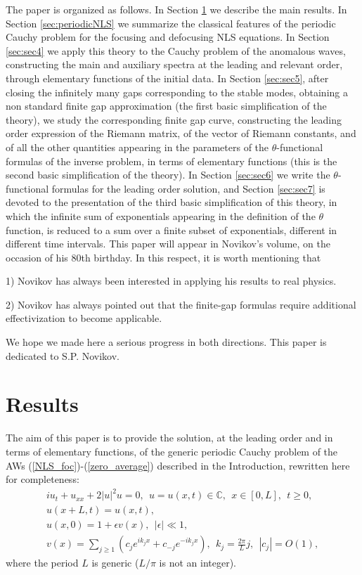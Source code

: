 \documentclass[12pt]{article}
\newcommand{\CC}{\mathbb C}
\newcommand{\beq}{\begin{equation}}
\newcommand{\eeq}{\end{equation}}
\newcommand{\ba}{\begin{array}}
\newcommand{\ea}{\end{array}}
\begin{document}
The paper is organized as follows. In Section \ref{sec:sec2} we describe the main results. In Section \ref{sec:periodicNLS}  we summarize the classical features of the periodic Cauchy problem for the focusing and defocusing NLS equations. In Section \ref{sec:sec4}  we apply this theory to the Cauchy problem of the anomalous waves, constructing the main and auxiliary spectra at the leading and relevant order, through elementary functions of the initial data. In Section \ref{sec:sec5}, after closing the infinitely many gaps corresponding to the stable modes, obtaining a non standard finite gap approximation (the first basic simplification of the theory), we study the corresponding finite gap curve, constructing the leading order expression of the Riemann matrix, of the vector of Riemann constants, and of all the other quantities appearing in the parameters of the $\theta$-functional formulas of the inverse problem, in terms of elementary functions (this is the second basic simplification of the theory). In Section \ref{sec:sec6} we write the $\theta$-functional formulas for the leading order solution, and Section \ref{sec:sec7} is devoted to the presentation of the third basic simplification of this theory, in which the infinite sum of exponentials appearing in the definition of the $\theta$ function, is reduced to a sum over a finite subset of exponentials, different in different time intervals. 
\vskip 10pt
\noindent
This paper will appear in Novikov's volume, on the occasion of his 80th birthday. In this respect, it is worth mentioning that

1) Novikov has always been interested in applying his results to real physics.

2) Novikov has always pointed out that the finite-gap formulas require additional
effectivization to become applicable.

We hope we made here a serious progress in both directions. This paper is dedicated to S.P. Novikov.


\section{Results}
\label{sec:sec2}

The aim of this paper is to provide the solution, at the leading order and in terms of elementary functions, of the generic periodic Cauchy problem of the AWs (\ref{NLS_foc})-(\ref{zero_average}) described in the Introduction, rewritten here for completeness:
\beq\label{Cauchy_AWs}
\ba{l}
  i u_t +u_{xx}+2 |u|^2 u=0, \ \ u=u(x,t)\in\CC , \ \ x\in [0,L], \ \ t\ge 0,\\
  u(x+L,t)=u(x,t),\\
u(x,0) = 1 + \epsilon v(x), \ \ |\epsilon|\ll 1, \\
v(x)=\sum\limits_{j\ge 1}\left(c_j e^{i k_j x}+c_{-j} e^{-i k_j x}\right), \ \ k_j=\frac{2\pi}{L}j , \ \ |c_j |=O(1),
\ea
\eeq
where the period $L$ is generic ($L/\pi$ is not an integer).
\end{document}
